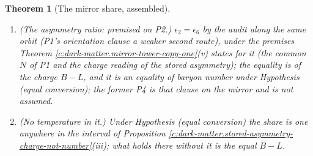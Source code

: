 \documentclass[11pt]{article}
\newtheorem{theorem}{Theorem}[section]
\theoremstyle{definition}
\theoremstyle{plain}
\begin{document}
\begin{theorem}[The mirror share, assembled]
\begin{enumerate}
\item[(iii)] \emph{(The asymmetry ratio: premised on P2.)} $\epsilon_{2} = \epsilon_{6}$ by the audit along the same orbit (P1's orientation clause a weaker second route), under the premises Theorem \ref{c:dark-matter.mirror-tower-copy-one}(v) states for it (the common $N$ of P1 and the charge reading of the stored asymmetry); the equality is of the charge $B - L$, and it is an equality of baryon number under Hypothesis (equal conversion); the former P4 is that clause on the mirror and is not assumed.
\item[(iv)] \emph{(No temperature in it.)} Under Hypothesis (equal conversion) the share is one anywhere in the interval of Proposition \ref{c:dark-matter.stored-asymmetry-charge-not-number}(iii); what holds there without it is the equal $B - L$.
\end{enumerate}
\end{theorem}
\end{document}
